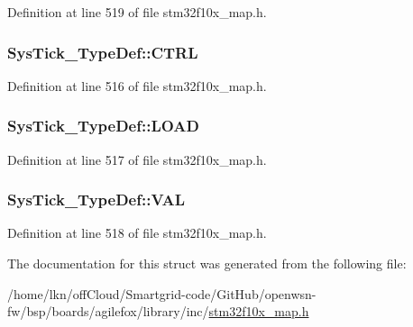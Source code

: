 Definition at line 519 of file stm32f10x\+\_\+map.\+h.

\subsubsection[{\texorpdfstring{C\+T\+RL}{CTRL}}]{ Sys\+Tick\+\_\+\+Type\+Def\+::\+C\+T\+RL}\hypertarget{struct_sys_tick___type_def_a3838cc3b90d811a73c6e8761591dc991}{}\label{struct_sys_tick___type_def_a3838cc3b90d811a73c6e8761591dc991}


Definition at line 516 of file stm32f10x\+\_\+map.\+h.

\subsubsection[{\texorpdfstring{L\+O\+AD}{LOAD}}]{ Sys\+Tick\+\_\+\+Type\+Def\+::\+L\+O\+AD}\hypertarget{struct_sys_tick___type_def_a09d0c60cc8b23be6cf34cffecacda090}{}\label{struct_sys_tick___type_def_a09d0c60cc8b23be6cf34cffecacda090}


Definition at line 517 of file stm32f10x\+\_\+map.\+h.

\subsubsection[{\texorpdfstring{V\+AL}{VAL}}]{ Sys\+Tick\+\_\+\+Type\+Def\+::\+V\+AL}\hypertarget{struct_sys_tick___type_def_ae1e7f1e5e25b16bc0a3c4ba4ff61aafc}{}\label{struct_sys_tick___type_def_ae1e7f1e5e25b16bc0a3c4ba4ff61aafc}


Definition at line 518 of file stm32f10x\+\_\+map.\+h.



The documentation for this struct was generated from the following file\+:\begin{DoxyCompactItemize}
\item 
/home/lkn/off\+Cloud/\+Smartgrid-\/code/\+Git\+Hub/openwsn-\/fw/bsp/boards/agilefox/library/inc/\hyperlink{agilefox_2library_2inc_2stm32f10x__map_8h}{stm32f10x\+\_\+map.\+h}\end{DoxyCompactItemize}
